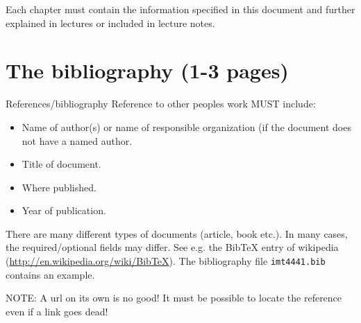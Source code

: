 \documentclass[macs]{gucmasterproject}
\begin{document}
Each chapter must contain the information specified in this document and further explained in 
lectures or included in lecture notes.









\chapter{The bibliography (1-3 pages)}
References/bibliography
Reference to other peoples work MUST include:
\begin{itemize}
\item Name of author(s)  or name of responsible organization (if the document does not have a named author.
\item Title of document.
\item Where published.
\item Year of publication.
\end{itemize}

There are many different types of documents (article, book etc.).
In many cases, the required/optional fields may differ.
See e.g. the BibTeX entry of wikipedia (\url{http://en.wikipedia.org/wiki/BibTeX}).
The bibliography file 
\verb+imt4441.bib+ 
contains an example.

NOTE: A url on its own is no good!
It must be possible to locate the reference even if a link goes dead!

\appendix

%

\end{document}
